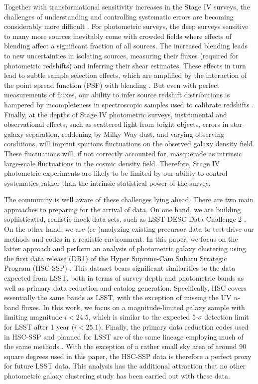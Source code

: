 \documentclass[a4paper,11pt]{article}
\begin{document}
Together with transformational sensitivity increases in the Stage IV surveys, the challenges of understanding and controlling systematic errors are becoming considerably more difficult \cite{1808.07335}. For photometric surveys, the deep surveys sensitive to many more sources inevitably come with crowded fields where effects of blending affect a significant fraction of all sources. The increased blending leads to new uncertainties in isolating sources, measuring their fluxes (required for photometric redshifts) and inferring their shear estimates. These effects in turn lead to subtle sample selection effects, which are amplified by the interaction of the point spread function (PSF) with blending \cite{1708.01533,1905.01324,1907.10572}. But even with perfect measurements of fluxes, our ability to infer source redshift distributions is hampered by incompleteness in spectroscopic samples used to calibrate redshifts \cite{1903.09325}. Finally, at the depths of Stage IV photometric surveys, instrumental and observational effects, such as scattered light from bright objects, errors in star-galaxy separation, reddening by Milky Way dust, and varying observing conditions, will imprint spurious fluctuations on the observed galaxy density field. These fluctuations will, if not correctly accounted for, masquerade as intrinsic large-scale fluctuations in the cosmic density field. Therefore, Stage IV photometric experiments are likely to be limited by our ability to control systematics rather than the intrinsic statistical power of the survey.

The community is well aware of these challenges lying ahead. There are two main approaches to preparing for the arrival of data. On one hand, we are building sophisticated, realistic mock data sets, such as LSST DESC Data Challenge 2 \cite{1909.07340,1907.06530}. On the other hand, we are (re-)analyzing existing precursor data to test-drive our methods and codes in a realistic environment. In this paper, we focus on the latter approach and perform an analysis of photometric galaxy clustering using the first data release (DR1) of the Hyper Suprime-Cam Subaru Strategic Program (HSC-SSP) \cite{2018PASJ...70S...8A}. This dataset bears significant similarities to the data expected from LSST, both in terms of survey depth and photometric bands as well as primary data reduction and catalog generation. Specifically, HSC covers essentially the same bands as LSST, with the exception of missing the UV $u$-band fluxes. In this work, we focus on a magnitude-limited galaxy sample with limiting magnitude $i<24.5$, which is similar to the expected 5-$\sigma$ detection limit for LSST after 1 year \cite{1809.01669} ($i<25.1$). Finally, the primary data reduction codes used in HSC-SSP and planned for LSST are of the same lineage employing much of the same methods \cite{2018PASJ...70S...5B,1812.03248}. With the exception of a rather small sky area of around 90 square degrees used in this paper, the HSC-SSP data is therefore a perfect proxy for future LSST data. This analysis has the additional attraction that no other photometric galaxy clustering study has been carried out with these data.
\end{document}
